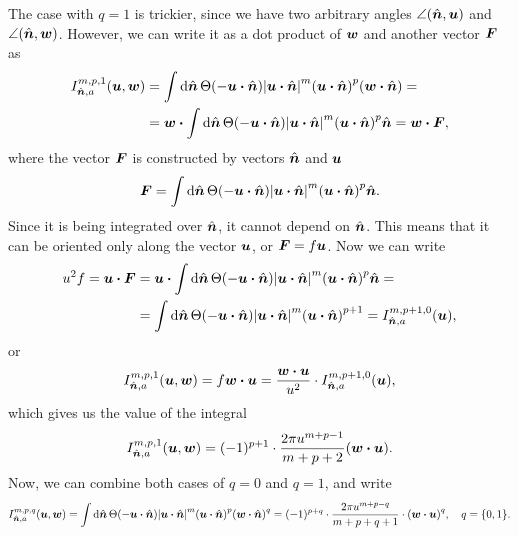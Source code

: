 \documentclass[aps,prl,preprint,groupedaddress,10pt]{revtex4-2}
\begin{document}
The case with $q=1$ is trickier, since we have two arbitrary angles $\angle(\hat{\vb*{n}},\vb*{u})$ and
$\angle(\hat{\vb*{n}},\vb*{w})$. However, we can write it as a dot product of $\vb*{w}$ and another vector
$\vb*{F}$ as
\begin{equation}
    \begin{split}
        I_{\bn,a}^{m,p,1}(\bu,\bw)&=\int\dd{\bn}\Theta\pqty{-\bu\vdot\bn}
        \abs{\bu\vdot\bn}^m\pqty{\bu\vdot\bn}^p\pqty{\bw\vdot\bn}=\\
        &=\bw\vdot\int\dd{\bn}\Theta\pqty{-\bu\vdot\bn}
        \abs{\bu\vdot\bn}^m\pqty{\bu\vdot\bn}^p\bn=\bw\vdot\bF,
    \end{split}
\end{equation}
where the vector $\vb*{F}$ is constructed by vectors $\hat{\vb*{n}}$ and $\vb*{u}$
\begin{equation}
    \bF = \int\dd{\bn}\Theta\pqty{-\bu\vdot\bn}\abs{\bu\vdot\bn}^m\pqty{\bu\vdot\bn}^p\bn.
\end{equation}
Since it is being integrated
over $\hat{\vb*{n}}$, it cannot depend on $\hat{\vb*{n}}$. This means that it can be oriented only along the
vector $\vb*{u}$, or $\vb*{F}=f\vb*{u}$. Now we can write
\begin{equation}
    \begin{split}
        u^2f = \bu\vdot\bF &= \bu\vdot
        \int\dd{\bn}\Theta\pqty{-\bu\vdot\bn}\abs{\bu\vdot\bn}^m\pqty{\bu\vdot\bn}^p\bn=\\
        &=\int\dd{\bn}\Theta\pqty{-\bu\vdot\bn}\abs{\bu\vdot\bn}^m\pqty{\bu\vdot\bn}^{p+1}=
        I_{\bn,a}^{m,p+1,0}(\bu),
    \end{split}
\end{equation}
or
\begin{equation}
    I_{\bn,a}^{m,p,1}(\bu,\bw)=f\bw\vdot\bu=\frac{\bw\vdot\bu}{u^2}
    \cdot I_{\bn,a}^{m,p+1,0}(\bu),
\end{equation}
which gives us the value of the integral
\begin{equation}
    I_{\bn,a}^{m,p,1}(\bu,\bw)=(-1)^{p+1}\cdot\frac{2\pi u^{m+p-1}}{m+p+2}\pqty{\bw\vdot\bu}.
\end{equation}
Now, we can combine both cases of $q=0$ and $q=1$, and write
\begin{equation}
    I_{\bn,a}^{m,p,q}(\bu,\bw)=\int\dd{\bn}\Theta\pqty{-\bu\vdot\bn}
    \abs{\bu\vdot\bn}^m\pqty{\bu\vdot\bn}^p\pqty{\bw\vdot\bn}^q=
    (-1)^{p+q}\cdot\frac{2\pi u^{m+p-q}}{m+p+q+1}
    \cdot\pqty{\bw\vdot\bu}^{q},\quad q=\Bqty{0,1}.
\end{equation}
\end{document}
